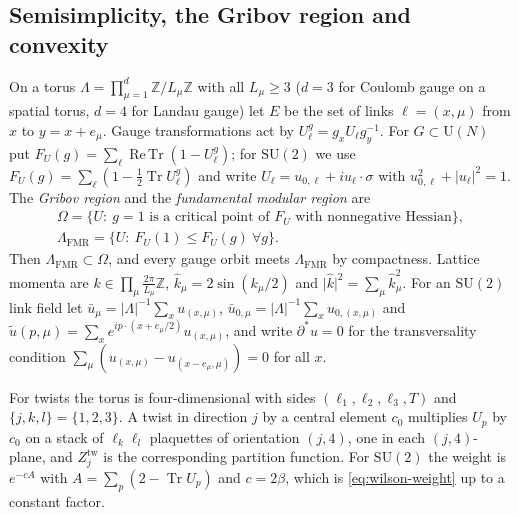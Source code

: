 \documentclass[11pt,a4paper]{amsart}
\theoremstyle{definition}
\theoremstyle{remark}
\numberwithin{equation}{section}
\DeclareMathOperator{\Tr}{Tr}        %
\DeclareMathOperator{\ReTr}{Re\,Tr}  %
\newcommand{\Z}{\mathbb{Z}}          %
\newcommand{\abs}[1]{\lvert #1\rvert}      %
\newcommand{\SU}{\mathrm{SU}}              %
\newcommand{\U}{\mathrm{U}}                %
\begin{document}
\subsection{Semisimplicity, the Gribov region and convexity}

On a torus $\Lambda=\prod_{\mu=1}^d\Z/L_\mu\Z$ with all $L_\mu\ge3$ ($d=3$ for Coulomb gauge on a spatial torus, $d=4$ for Landau gauge) let $E$ be the set of links $\ell=(x,\mu)$ from $x$ to $y=x+e_\mu$. Gauge transformations act by $U^g_\ell=g_xU_\ell g_y^{-1}$. For $G\subset\U(N)$ put $F_U(g)=\sum_\ell\ReTr(1-U^g_\ell)$; for $\SU(2)$ we use $F_U(g)=\sum_\ell(1-\frac12\Tr U^g_\ell)$ and write $U_\ell=u_{0,\ell}+iu_\ell\cdot\sigma$ with $u_{0,\ell}^2+\abs{u_\ell}^2=1$. The \emph{Gribov region} and the \emph{fundamental modular region} are
\[
\begin{gathered}
\Omega=\{U:\ g=1\text{ is a critical point of }F_U\text{ with nonnegative Hessian}\},\\
\Lambda_{\mathrm{FMR}}=\{U:\ F_U(1)\le F_U(g)\ \forall g\}.
\end{gathered}
\]
Then $\Lambda_{\mathrm{FMR}}\subset\Omega$, and every gauge orbit meets $\Lambda_{\mathrm{FMR}}$ by compactness. Lattice momenta are $k\in\prod_\mu\frac{2\pi}{L_\mu}\Z$, $\hat k_\mu=2\sin(k_\mu/2)$ and $\abs{\hat k}^2=\sum_\mu\hat k_\mu^2$. For an $\SU(2)$ link field let $\bar u_\mu=\abs{\Lambda}^{-1}\sum_xu_{(x,\mu)}$, $\bar u_{0,\mu}=\abs{\Lambda}^{-1}\sum_xu_{0,(x,\mu)}$ and $\tilde u(p,\mu)=\sum_xe^{ip\cdot(x+e_\mu/2)}u_{(x,\mu)}$, and write $\partial^*u=0$ for the transversality condition $\sum_\mu(u_{(x,\mu)}-u_{(x-e_\mu,\mu)})=0$ for all $x$.

For twists the torus is four-dimensional with sides $(\ell_1,\ell_2,\ell_3,T)$ and $\{j,k,l\}=\{1,2,3\}$. A twist in direction $j$ by a central element $c_0$ multiplies $U_p$ by $c_0$ on a stack of $\ell_k\ell_l$ plaquettes of orientation $(j,4)$, one in each $(j,4)$-plane, and $Z^{\mathrm{tw}}_j$ is the corresponding partition function. For $\SU(2)$ the weight is $e^{-cA}$ with $A=\sum_p(2-\Tr U_p)$ and $c=2\beta$, which is \eqref{eq:wilson-weight} up to a constant factor.
\end{document}

